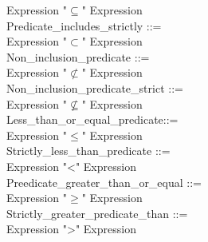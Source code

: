 \documentclass[12pt,a4paper,draft]{article}
\begin{document}
{\begin{sloppypar}
\hspace*{0.20in} Expression  "$\subseteq$"  Expression\\
Predicate\_includes\_strictly  ::= \\
\hspace*{0.20in} Expression  "$\subset$"  Expression\\
Non\_inclusion\_predicate ::= \\
\hspace*{0.20in} Expression  "$\nsubset$"  Expression\\
Non\_inclusion\_predicate\_strict ::= \\
\hspace*{0.20in} Expression  "$\nsubseteq$"  Expression   \\
Less\_than\_or\_equal\_predicate::= \\
\hspace*{0.20in} Expression  "$\leq$"  Expression\\
Strictly\_less\_than\_predicate ::= \\
\hspace*{0.20in} Expression  "<"  Expression\\
Preedicate\_greater\_than\_or\_equal ::= \\
\hspace*{0.20in} Expression  "$\geq$"  Expression\\
Strictly\_greater\_predicate\_than ::= \\
\hspace*{0.20in} Expression  ">"  Expression\\

\end{sloppypar} 
}
\end{document}
